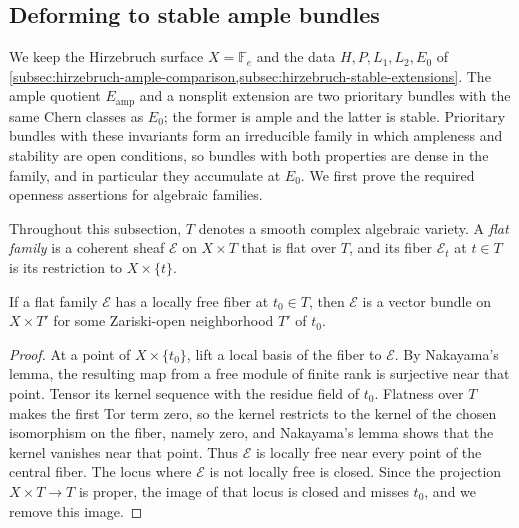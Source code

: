 \subsection{Deforming to stable ample bundles}
\label{subsec:hirzebruch-stable-ample-deformations}

We keep the Hirzebruch surface $X=\mathbb F_e$ and the data $H,P,L_1,L_2,E_0$ of \cref{subsec:hirzebruch-ample-comparison,subsec:hirzebruch-stable-extensions}. The ample quotient $E_{\mathrm{amp}}$ and a nonsplit extension are two prioritary bundles with the same Chern classes as $E_0$; the former is ample and the latter is stable. Prioritary bundles with these invariants form an irreducible family in which ampleness and stability are open conditions, so bundles with both properties are dense in the family, and in particular they accumulate at $E_0$. We first prove the required openness assertions for algebraic families.

Throughout this subsection, $T$ denotes a smooth complex algebraic variety. A \emph{flat family} is a coherent sheaf $\mathcal E$ on $X\times T$ that is flat over $T$, and its fiber $\mathcal E_t$ at $t\in T$ is its restriction to $X\times\{t\}$.

\begin{lemma}\label{lem:hirzebruch-family-local-freeness}
If a flat family $\mathcal E$ has a locally free fiber at $t_0\in T$, then $\mathcal E$ is a vector bundle on $X\times T'$ for some Zariski-open neighborhood $T'$ of $t_0$.
\end{lemma}
\begin{proof}
At a point of $X\times\{t_0\}$, lift a local basis of the fiber to $\mathcal E$. By Nakayama's lemma, the resulting map from a free module of finite rank is surjective near that point. Tensor its kernel sequence with the residue field of $t_0$. Flatness over $T$ makes the first Tor term zero, so the kernel restricts to the kernel of the chosen isomorphism on the fiber, namely zero, and Nakayama's lemma shows that the kernel vanishes near that point. Thus $\mathcal E$ is locally free near every point of the central fiber. The locus where $\mathcal E$ is not locally free is closed. Since the projection $X\times T\to T$ is proper, the image of that locus is closed and misses $t_0$, and we remove this image.
\end{proof}

